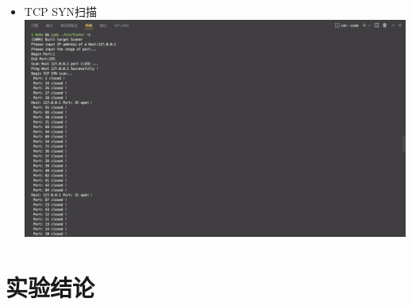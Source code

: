 \documentclass[UTF8,a4paper,10pt]{ctexart}
\begin{document}
\begin{itemize}
    \item TCP SYN扫描\\ 
    \includegraphics[scale = 0.25]{img/11.png}
\end{itemize}

\section{实验结论}
\end{document}
